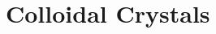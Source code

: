 \documentclass[\main/dresen_thesis.tex]{subfiles}
\begin{document}
\section{Colloidal Crystals}
\end{document}
